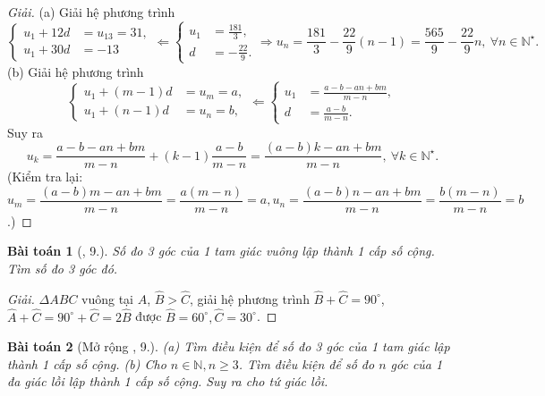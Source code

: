 \documentclass[oneside]{book}
\newtheorem{baitoan}{Bài toán}
\begin{document}
\begin{proof}[Giải]
	(a) Giải hệ phương trình
	\begin{equation*}
		\left\{\begin{split}
			u_1 + 12d &= u_{13} = 31,\\
			u_1 + 30d &= -13
		\end{split}\right.\Leftarrow\left\{\begin{split}
			u_1 &= \frac{181}{3},\\
			d &= -\frac{22}{9}.
		\end{split}\right.\Rightarrow u_n = \frac{181}{3} -  \frac{22}{9}(n - 1) = \frac{565}{9} - \frac{22}{9}n,\ \forall n\in\mathbb{N}^\star.
	\end{equation*}
	(b) Giải hệ phương trình
	\begin{equation*}
		\left\{\begin{split}
			u_1 + (m - 1)d &= u_m = a,\\
			u_1 + (n - 1)d &= u_n = b,
		\end{split}\right.\Leftarrow\left\{\begin{split}
			u_1 &= \frac{a - b - an + bm}{m - n},\\
			d &= \frac{a - b}{m - n}.
		\end{split}\right.
	\end{equation*}
	Suy ra
	\begin{equation*}
		u_k = \frac{a - b - an + bm}{m - n} + (k - 1)\frac{a - b}{m - n} = \frac{(a - b)k - an + bm}{m - n},\ \forall k\in\mathbb{N}^\star.
	\end{equation*}
	(Kiểm tra lại: $u_m = \dfrac{(a - b)m - an + bm}{m - n} = \dfrac{a(m - n)}{m - n} = a,u_n = \dfrac{(a - b)n - an + bm}{m - n} = \dfrac{b(m - n)}{m - n} = b$.)
\end{proof}

\begin{baitoan}[\cite{TLCT_dai_so_giai_tich_11}, 9.]
	Số đo 3 góc của 1 tam giác vuông lập thành 1 cấp số cộng. Tìm số đo 3 góc đó.
\end{baitoan}

\begin{proof}[Giải]
	$\Delta ABC$ vuông tại $A$, $\widehat{B} > \widehat{C}$, giải hệ phương trình $\widehat{B} + \widehat{C} = 90^\circ$, $\widehat{A} + \widehat{C} = 90^\circ + \widehat{C} = 2\widehat{B}$ được $\widehat{B} = 60^\circ,\widehat{C} = 30^\circ$.
\end{proof}

\begin{baitoan}[Mở rộng \cite{TLCT_dai_so_giai_tich_11}, 9.]
	(a) Tìm điều kiện để số đo 3 góc của 1 tam giác lập thành 1 cấp số cộng. (b) Cho $n\in\mathbb{N},n\ge3$. Tìm điều kiện để số đo $n$ góc của 1 đa giác lồi lập thành 1 cấp số cộng. Suy ra cho tứ giác lồi.
\end{baitoan}
\end{document}
